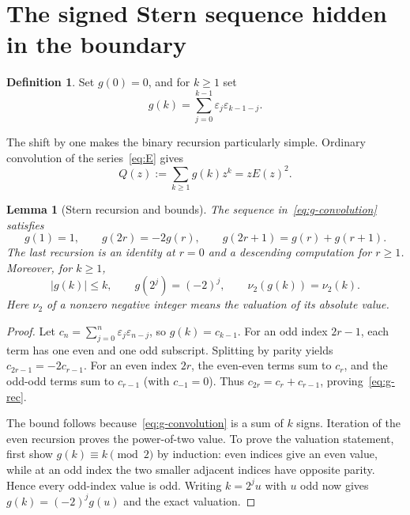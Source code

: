 \documentclass[11pt,a4paper]{article}
\numberwithin{equation}{section}
\newtheorem{lemma}[theorem]{Lemma}
\theoremstyle{definition}
\newtheorem{definition}[theorem]{Definition}
\theoremstyle{remark}
\newcommand{\eps}{\varepsilon}
\newcommand{\vnu}{\nu_2}
\begin{document}
\section{The signed Stern sequence hidden in the boundary}
\label{sec:stern}

\begin{definition}
Set $g(0)=0$, and for $k\ge1$ set
\begin{equation}
 g(k)=\sum_{j=0}^{k-1}\eps_j\eps_{k-1-j}.
 \label{eq:g-convolution}
\end{equation}
\end{definition}
The shift by one makes the binary recursion particularly simple. Ordinary
convolution of the series~\eqref{eq:E} gives
\begin{equation}
 Q(z):=\sum_{k\ge1}g(k)z^k=zE(z)^2.
 \label{eq:Q}
\end{equation}

\begin{lemma}[Stern recursion and bounds]
\label{lem:stern}
The sequence in~\eqref{eq:g-convolution} satisfies
\begin{equation}
 g(1)=1,\qquad g(2r)=-2g(r),\qquad
 g(2r+1)=g(r)+g(r+1).
 \label{eq:g-rec}
\end{equation}
The last recursion is an identity at $r=0$ and a descending computation for
$r\ge1$. Moreover, for $k\ge1$,
\begin{equation}
 |g(k)|\le k,\qquad g(2^j)=(-2)^j,\qquad
 \vnu(g(k))=\vnu(k).
 \label{eq:g-arithmetic}
\end{equation}
Here $\vnu$ of a nonzero negative integer means the valuation of its absolute value.
\end{lemma}
\begin{proof}
Let $c_n=\sum_{j=0}^n\eps_j\eps_{n-j}$, so $g(k)=c_{k-1}$.
For an odd index $2r-1$, each term has one even and one odd subscript. Splitting
by parity yields $c_{2r-1}=-2c_{r-1}$. For an even index $2r$, the even-even
terms sum to $c_r$, and the odd-odd terms sum to $c_{r-1}$ (with $c_{-1}=0$).
Thus $c_{2r}=c_r+c_{r-1}$, proving~\eqref{eq:g-rec}.

The bound follows because~\eqref{eq:g-convolution} is a sum of $k$ signs.
Iteration of the even recursion proves the power-of-two value. To prove the
valuation statement, first show $g(k)\equiv k\pmod2$ by induction: even indices
give an even value, while at an odd index the two smaller adjacent indices have
opposite parity. Hence every odd-index value is odd. Writing $k=2^ju$ with $u$
odd now gives $g(k)=(-2)^jg(u)$ and the exact valuation.
\end{proof}
\end{document}
